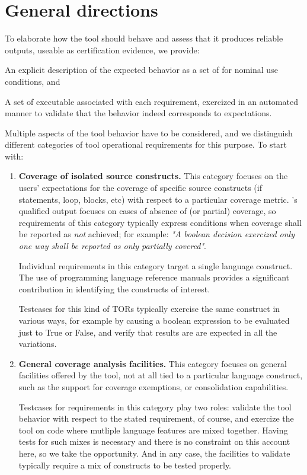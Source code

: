 \documentclass {report}
\begin{document}
\section{General directions}

To elaborate how the tool should behave and assess that it produces reliable
outputs, useable as certification evidence, we provide:

\begin{Itemize}
\item%
  An explicit description of the expected behavior as a set of  for nominal use conditions, and
\item%
  A set of executable  associated with each requirement,
  exercized in an automated manner to validate that the behavior indeed
  corresponds to expectations.
\end{Itemize}

Multiple aspects of the tool behavior have to be considered, and we
distinguish different categories of tool operational requirements for this
purpose.
%
To start with:

\begin{enumerate}
\item \textbf{Coverage of isolated source constructs.}
%
This category focuses on the users' expectations for the coverage of
specific source constructs (if statements, loop, blocks, etc) with respect to
a particular coverage metric.
%
\xcov{}'s qualified output focuses on cases of absence of (or partial)
coverage, so requirements of this category typically express conditions when
coverage shall be reported as \emph{not} achieved;
%
for example: \emph{"A boolean decision exercized only one way shall be
reported as only partially covered"}.

Individual requirements in this category target a single language construct.
%
The use of programming language reference manuals provides a significant
contribution in identifying the constructs of interest.

Testcases for this kind of TORs typically exercise the same construct in
various ways, for example by causing a boolean expression to be evaluated just
to True or False, and verify that results are are expected in all the
variations.

\item \textbf{General coverage analysis facilities.}
%
This category focuses on general facilities offered by the tool, not at all
tied to a particular language construct, such as the support for coverage
exemptions, or consolidation capabilities.

Testcases for requirements in this category play two roles: validate the tool
behavior with respect to the stated requirement, of course, and exercize the
tool on code where mutliple language features are mixed together.
%
Having tests for such mixes is necessary and there is no constraint on this
account here, so we take the opportunity.
% 
And in any case, the facilities to validate typically require a mix of
constructs to be tested properly.
\end{enumerate}
\end{document}
